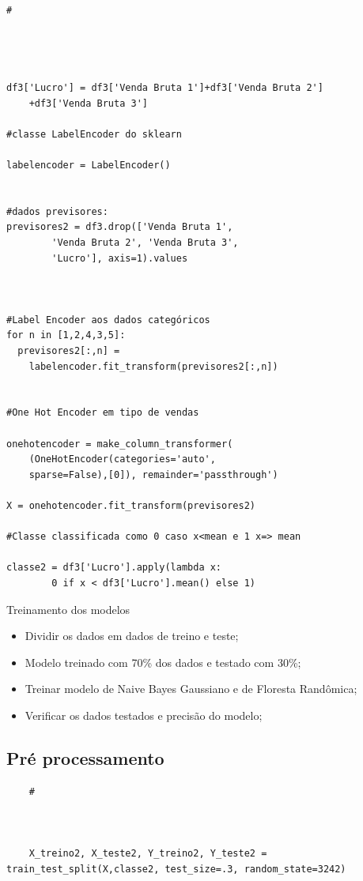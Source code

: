 \documentclass[compress]{beamer}
\begin{document}
\begin{verbatim}
#




df3['Lucro'] = df3['Venda Bruta 1']+df3['Venda Bruta 2']
    +df3['Venda Bruta 3']

#classe LabelEncoder do sklearn

labelencoder = LabelEncoder()


#dados previsores:
previsores2 = df3.drop(['Venda Bruta 1',
        'Venda Bruta 2', 'Venda Bruta 3',
        'Lucro'], axis=1).values



#Label Encoder aos dados categóricos
for n in [1,2,4,3,5]:
  previsores2[:,n] =
	labelencoder.fit_transform(previsores2[:,n])
	
	
#One Hot Encoder em tipo de vendas

onehotencoder = make_column_transformer(
    (OneHotEncoder(categories='auto',
    sparse=False),[0]), remainder='passthrough')

X = onehotencoder.fit_transform(previsores2)

#Classe classificada como 0 caso x<mean e 1 x=> mean

classe2 = df3['Lucro'].apply(lambda x:
        0 if x < df3['Lucro'].mean() else 1)
\end{verbatim}


\begin{frame}{Treinamento dos modelos}
\begin{itemize}
    \item Dividir os dados em dados de treino e teste;
    \item Modelo treinado com 70\% dos dados e testado com 30\%;
    \item Treinar modelo de Naive Bayes Gaussiano e de Floresta Randômica;
    \item Verificar os dados testados e precisão do modelo;
\end{itemize}
\end{frame}

\subsection{Pré processamento}
\begin{verbatim}
    #
    
    
    
    X_treino2, X_teste2, Y_treino2, Y_teste2 = train_test_split(X,classe2, test_size=.3, random_state=3242)
    
    
\end{verbatim}
\end{document}
